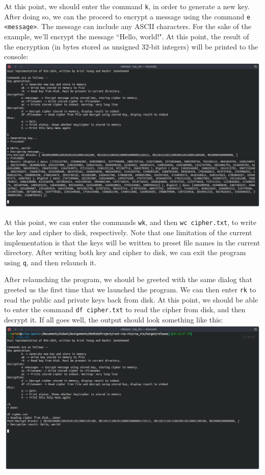 \documentclass{article}
\newcommand{\code}[1]{\colorbox{light-gray}{\texttt{#1}}}
\begin{document}
At this point, we should enter the command \code{k}, in order to generate a new key. After doing so, we can the proceed to encrypt a message using the command \code{e <message>}. The message can include any ASCII characters. For the sake of the example, we'll encrypt the message ``Hello, world!". At this point, the result of the encryption (in bytes stored as unsigned 32-bit integers) will be printed to the console: \\
\includegraphics[width=\textwidth]{two}

At this point, we can enter the commands \code{wk}, and then \code{wc cipher.txt}, to write the key and cipher to disk, respectively. Note that one limitation of the current implementation is that the keys will be written to preset file names in the current directory. After writing both key and cipher to disk, we can exit the program using \code{q}, and then relaunch it.

After relaunching the program, we should be greeted with the same dialog that greeted us the first time that we launched the program. We can then enter \code{rk} to read the public and private keys back from disk. At this point, we should be able to enter the command \code{df cipher.txt} to read the cipher from disk, and then decrypt it. If all goes well, the output should look something like this:
\includegraphics[width=\textwidth]{three}
\end{document}
